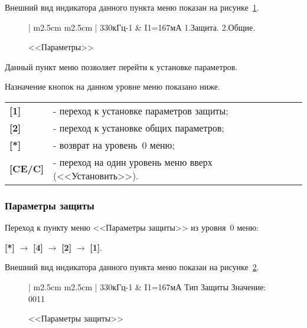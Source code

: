 Внешний вид индикатора данного пункта меню показан на рисунке~\ref{fig:setup_param}.
 
\begin{figure}[H]
	\centering
	
	\begin{tabular}{| m{2.5cm}  m{2.5cm} |}
		\firsthline
		330кГц-1	& \raggedleft I1=167мА		\tabularnewline 
		 {1.Защита.}		\tabularnewline
		 {2.Общие.} 		\tabularnewline 
		 {}					\tabularnewline 
		\lasthline
	\end{tabular} 
	
	\caption{<<Параметры>>}
	\label{fig:setup_param}
\end{figure}

Данный пункт меню позволяет перейти к установке параметров.

Назначение кнопок на данном уровне меню показано ниже.
\begin{center}
	\begin{tabular}{p{2cm} p{15cm}}
		\textbf{[1]}  	& - переход к установке параметров защиты; \tabularnewline
		\textbf{[2]}	& - переход к установке общих параметров; \tabularnewline
		\textbf{[*]} 	& - возврат на уровень~0 меню; \tabularnewline
		\textbf{[CE/C]} & - переход на один уровень меню вверх (<<Установить>>). \tabularnewline				
	\end{tabular}
\end{center} 



\subsubsection{Параметры защиты} \label{sssec:setup_param_def}

Переход к пункту меню <<Параметры защиты>> из уровня~0 меню:

\textbf{[*]} $\rightarrow$ \textbf{[4]} $\rightarrow$ \textbf{[2]} $\rightarrow$ \textbf{[1]}.

Внешний вид индикатора данного пункта меню показан на рисунке~\ref{fig:setup_param_def}.
 
\begin{figure}[H]
	\centering
	
	\begin{tabular}{| m{2.5cm}  m{2.5cm} |}
		\firsthline
		330кГц-1	& \raggedleft I1=167мА		\tabularnewline 
		 {Тип Защиты}		\tabularnewline
		 {Значение: 0011} 	\tabularnewline 
		 {}					\tabularnewline 
		\lasthline
	\end{tabular} 
	
	\caption{<<Параметры защиты>>}
	\label{fig:setup_param_def}
\end{figure}

